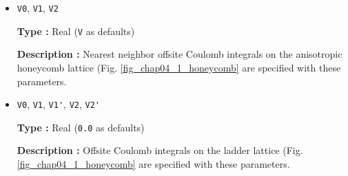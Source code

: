 \begin{itemize}
\item \verb|V0|, \verb|V1|, \verb|V2|

{\bf Type :} Real (\verb|V| as defaults)

{\bf Description :} Nearest neighbor offsite Coulomb integrals 
on the anisotropic honeycomb lattice
(Fig. \ref{fig_chap04_1_honeycomb} are specified with these parameters.

\item \verb|V0|, \verb|V1|, \verb|V1'|, \verb|V2|, \verb|V2'|

{\bf Type :} Real (\verb|0.0| as defaults)

{\bf Description :} Offsite Coulomb integrals 
on the ladder lattice
(Fig. \ref{fig_chap04_1_honeycomb} are specified with these parameters.

\end{itemize}

